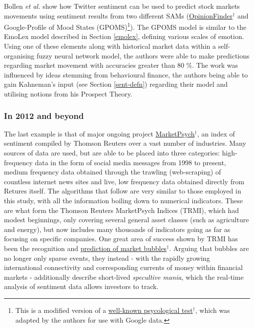 \documentclass{article}
\begin{document}
Bollen \emph{et al.} \cite{DBLP:journals/corr/abs-1010-3003} show how Twitter sentiment can be used to predict stock markets movements using sentiment results from two different SAMs (\href{http://mpqa.cs.pitt.edu/opinionfinder/}{OpinionFinder$^{\dag{}}$} and Google-Profile of Mood States (GPOMS)\footnote{This is a modified version of a \href{http://www.brianmac.co.uk/poms.htm}{well-known psycological test$^{\dag{}}$}, which was adapted by the authors for use with Google data.}). The GPOMS model is similar to the EmoLex model described in Section \ref{emolex}, defining various scales of emotion. Using one of these elements along with historical market data within a self-organising fuzzy neural network model, the authors were able to make predictions regarding market movement with accuracies greater than 80 \%. The work was influenced by ideas stemming from behavioural finance, the authors being able to gain Kahneman's input (see Section \ref{sent-defn}) regarding their model and utilising notions from his Prospect Theory.


\subsubsection{In 2012 and beyond}
\label{sec-4-5-3}

The last example is that of major ongoing project \href{https://www.marketpsych.com/guide/}{MarketPsych$^{\dag{}}$}, an index of sentiment compiled by Thomson Reuters over a vast number of industries. Many sources of data are used, but are able to be placed into three categories: high-frequency data in the form of social media messages from 1998 to present, medium frequency data obtained through the trawling (web-scraping) of countless internet news sites and live, low frequency data obtained directly from Retures itself. The algorithms that follow are very similar to those employed in this study, with all the information boiling down to numerical indicators. These are what form the Thomson Reuters MarketPsych Indices (TRMI), which had modest beginnings, only covering several general asset classes (such as agriculture and energy), but now includes many thousands of indicators going as far as focusing on specific companies.
One great area of success shown by TRMI has been the recognition and \href{http://thomsonreuters.com/en/articles/2015/understanding-bubbles.html}{prediction of market bubbles$^{\dag{}}$}. Arguing that bubbles are no longer only sparse events, they instead - with the rapidly growing international connectivity and corresponding currents of money within financial markets - additionally describe short-lived \emph{specultive mania}, which the real-time analysis of sentiment data allows investors to track.
\end{document}
